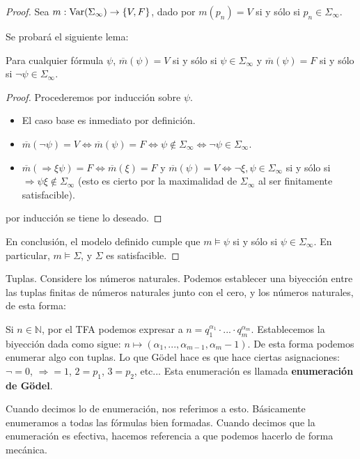 \documentclass[12pt]{report}
\newcounter{it}
\theoremstyle{largebreak}
\newcommand\cf[3]{\ensuremath{#1:#2\rightarrow#3}}
\begin{document}
\begin{proof}
        Sea $\cf{m}{\textup{Var}(\Sigma_\infty)}{\left\{V,F\right\}}$, dado por $m(p_n)=V$ si y sólo si $p_n\in \Sigma_\infty$.

        Se probará el siguiente lema:

        \begin{lema}
            Para cualquier fórmula $\psi$, $\overline{m}(\psi)=V$ si y sólo si $\psi\in\Sigma_\infty$ y $\overline{m}(\psi)=F$ si y sólo si $\neg\psi\in\Sigma_\infty$.
        \end{lema}

        \begin{proof}
            Procederemos por inducción sobre $\psi$.
            \begin{itemize}
                \item El caso base es inmediato por definición.
                \item $\overline{m}(\neg\psi)=V\iff\overline{m}(\psi)=F\iff\psi\notin\Sigma_\infty\iff\neg\psi\in\Sigma_\infty$.
                \item $\overline{m}(\Rightarrow\xi\psi)=F\iff\overline{m}(\xi)=F$ y $\overline{m}(\psi)=V\iff\neg\xi,\psi\in\Sigma_\infty$ si y sólo si $\Rightarrow \psi\xi\notin\Sigma_\infty$ (esto es cierto por la maximalidad de $\Sigma_\infty$ al ser finitamente satisfacible).
            \end{itemize}
            por inducción se tiene lo deseado.
        \end{proof}

        En conclusión, el modelo definido cumple que $m\vDash\psi$ si y sólo si $\psi\in\Sigma_\infty$. En particular, $m\vDash\Sigma$, y $\Sigma$ es satisfacible.

    \end{proof}

    \begin{obs}
        Tuplas. Considere los números naturales. Podemos establecer una biyección entre las tuplas finitas de números naturales junto con el cero, y los números naturales, de esta forma:

        Si $n\in\mathbb{N}$, por el TFA podemos expresar a $n=q_1^{\alpha_1}\cdot...\cdot q_m^{\alpha_m}$. Establecemos la biyección dada como sigue: $n\mapsto(\alpha_1,...,\alpha_{m-1},\alpha_{m}-1)$. De esta forma podemos enumerar algo con tuplas. Lo que Gödel hace es que hace ciertas asignaciones: $\neg=0$, $\Rightarrow=1$, $2=p_1$, $3=p_2$, etc... Esta enumeración es llamada \textbf{enumeración de Gödel}.

        Cuando decimos lo de enumeración, nos referimos a esto. Básicamente enumeramos a todas las fórmulas bien formadas. Cuando decimos que la enumeración es efectiva, hacemos referencia a que podemos hacerlo de forma mecánica.
    \end{obs}
\end{document}
